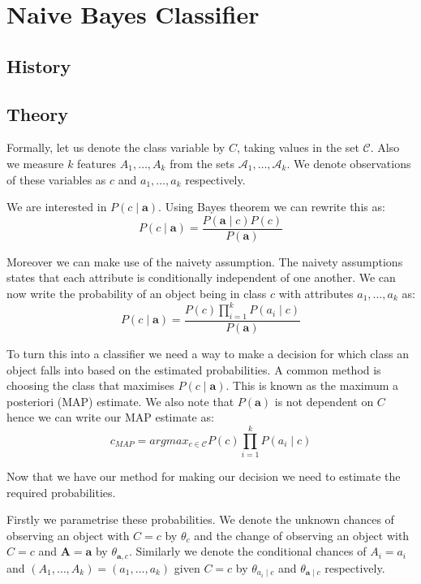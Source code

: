 \chapter{Naive Bayes Classifier}

\section{History}

\section{Theory}

Formally, let us denote the class variable by $C$, taking values in the set $\mathcal{C}$. Also we measure $k$ features $A_1,\dots,A_k$ from the sets $\mathcal{A}_1,\dots,\mathcal{A}_k$. We denote observations of these variables as $c$ and $a_1,\dots,a_k$ respectively.

We are interested in $P(c \mid \mathbf{a})$. Using Bayes theorem we can rewrite this as:
\begin{equation}
	P(c \mid \mathbf{a}) = \frac{P(\mathbf{a} \mid c)P(c)}{P(\mathbf{a})}
\end{equation}

Moreover we can make use of the naivety assumption. The naivety assumptions states that each attribute is conditionally independent of one another. We can now write the probability of an object being in class $c$ with attributes $a_1,\dots,a_k$ as:
\begin{equation}
	P(c \mid \mathbf{a}) = \frac{P(c)\prod_{i=1}^{k}P(a_i \mid c)}{P(\mathbf{a})}
\end{equation}

To turn this into a classifier we need a way to make a decision for which class an object falls into based on the estimated probabilities. A common method is choosing the class that maximises $P(c \mid \mathbf{a})$. This is known as the maximum a posteriori (MAP) estimate. We also note that $P(\mathbf{a})$ is not dependent on $C$ hence we can write our MAP estimate as:
\begin{equation}
	c_{MAP} = argmax_{c \in \mathcal{C}} P(c)\prod_{i=1}^{k}P(a_i \mid c)
\end{equation}

Now that we have our method for making our decision we need to estimate the required probabilities.

Firstly we parametrise these probabilities. We denote the unknown chances of observing an object with $C=c$ by $\theta_c$ and the change of observing an object with $C=c$ and $\mathbf{A} = \mathbf{a}$ by $\theta_{\mathbf{a}, c}$. Similarly we denote the conditional chances of $A_i=a_i$ and $(A_1,\dots,A_k)=(a_1,\dots,a_k)$ given $C=c$ by $\theta_{a_i \mid c}$ and $\theta_{\mathbf{a} \mid c}$ respectively.

